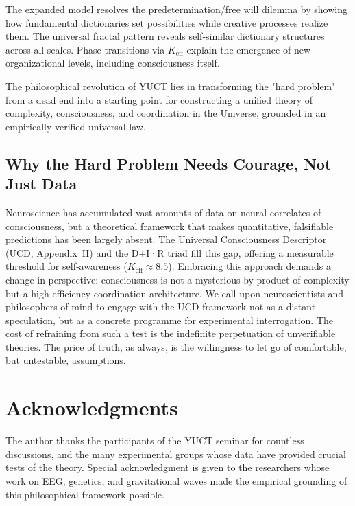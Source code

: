 \documentclass[12pt,a4paper]{article}
\newcommand{\eff}{\mathrm{eff}}
\newcommand{\Ke}{K_{\eff}}
\begin{document}
	The expanded model resolves the predetermination/free will dilemma by showing how fundamental dictionaries set possibilities while creative processes realize them. The universal fractal pattern reveals self-similar dictionary structures across all scales. Phase transitions via $\Ke$ explain the emergence of new organizational levels, including consciousness itself.
	
	The philosophical revolution of YUCT lies in transforming the "hard problem" from a dead end into a starting point for constructing a unified theory of complexity, consciousness, and coordination in the Universe, grounded in an empirically verified universal law.
	
	\subsection{Why the Hard Problem Needs Courage, Not Just Data}
	\label{subsec:courage-consciousness}
	
	Neuroscience has accumulated vast amounts of data on neural correlates of consciousness, but a theoretical framework that makes quantitative, 
	falsifiable predictions has been largely absent.  The Universal Consciousness Descriptor (UCD, Appendix~H) and the D+I·R triad fill this gap, offering 
	a measurable threshold for self‑awareness ($K_{\mathrm{eff}} \approx 8.5$).  Embracing this approach demands a change in perspective: consciousness is 
	not a mysterious by‑product of complexity but a high‑efficiency coordination architecture.  We call upon neuroscientists and philosophers of mind to engage 
	with the UCD framework not as a distant speculation, but as a concrete programme for experimental interrogation.  The cost of refraining from such a 
	test is the indefinite perpetuation of unverifiable theories.  The price of truth, as always, is the willingness to let go of comfortable, but untestable, assumptions.
	
	\section*{Acknowledgments}
	
	The author thanks the participants of the YUCT seminar for countless discussions, and the many experimental groups whose data have provided crucial tests of the theory. Special acknowledgment is given to the researchers whose work on EEG, genetics, and gravitational waves made the empirical grounding of this philosophical framework possible.
	
\end{document}

